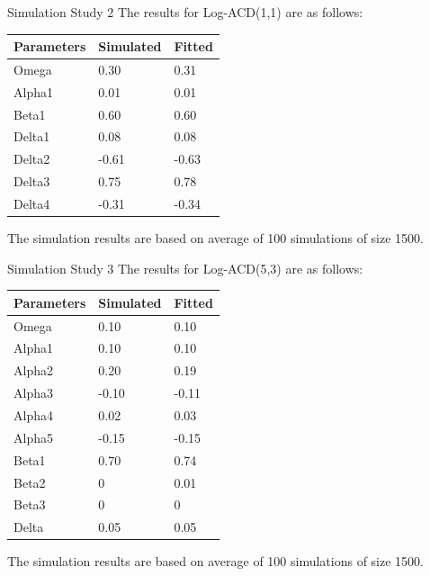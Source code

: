 \documentclass[
  ignorenonframetext,
]{beamer}
\begin{document}
\begin{frame}{Simulation Study 2}
\protect\hypertarget{simulation-study-2}{}
The results for Log-ACD(1,1) are as follows:

\begin{tabular}{ |p{2cm}|p{2cm}|p{2cm}|  }
 \hline
 Parameters& Simulated & Fitted \\
 \hline
 Omega   & 0.30 & 0.31  \\
  \hline
 Alpha1   & 0.01 & 0.01  \\
  \hline
 Beta1  & 0.60 & 0.60  \\
  \hline
 Delta1   & 0.08 & 0.08  \\
  \hline
 Delta2   & -0.61 & -0.63  \\
  \hline
 Delta3   & 0.75 & 0.78   \\
  \hline
 Delta4   & -0.31 & -0.34 \\
  \hline
\end{tabular}

The simulation results are based on average of 100 simulations of size
1500.
\end{frame}

\begin{frame}{Simulation Study 3}
\protect\hypertarget{simulation-study-3}{}
The results for Log-ACD(5,3) are as follows:

\begin{tabular}{ |p{2cm}|p{2cm}|p{2cm}|  }
 \hline
 Parameters& Simulated & Fitted \\
 \hline
 Omega   & 0.10 & 0.10  \\
  \hline
 Alpha1   & 0.10 & 0.10  \\
  \hline
 Alpha2  & 0.20 & 0.19  \\
  \hline
 Alpha3   & -0.10 & -0.11  \\
  \hline
 Alpha4   & 0.02 & 0.03  \\
  \hline
 Alpha5   & -0.15 & -0.15   \\
  \hline
 Beta1   & 0.70 & 0.74 \\
  \hline
 Beta2   & 0 & 0.01 \\
  \hline
 Beta3   & 0 & 0 \\
  \hline
 Delta   & 0.05 & 0.05 \\
  \hline
\end{tabular}

The simulation results are based on average of 100 simulations of size
1500.
\end{frame}
\end{document}
